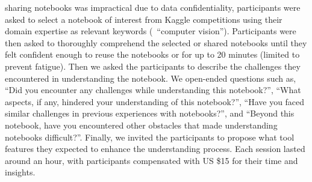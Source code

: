  sharing notebooks was impractical due to data confidentiality, participants were asked to select a notebook of interest from Kaggle competitions using their domain expertise as relevant keywords (\eg~``computer vision'').
Participants were then asked to thoroughly comprehend the selected or shared notebooks until they felt confident enough to reuse the notebooks or for up to 20 minutes (limited to prevent fatigue). 
Then we asked the participants to describe the challenges they encountered in understanding the notebook.
We  open-ended questions such as, ``Did you encounter any challenges while understanding this notebook?'', ``What aspects, if any, hindered your understanding of this notebook?'', ``Have you faced similar challenges in previous experiences with notebooks?'', and ``Beyond this notebook, have you encountered other obstacles that made understanding notebooks difficult?''.
%  
Finally, we invited the participants to propose what tool features they expected to enhance the understanding process.
Each session lasted around an hour, with participants compensated with US \$15 for their time and insights.

